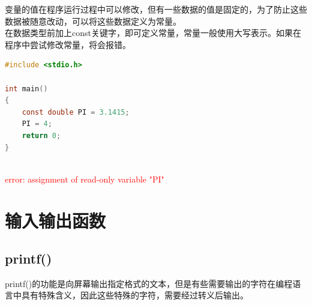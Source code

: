 变量的值在程序运行过程中可以修改，但有一些数据的值是固定的，为了防止这些数据被随意改动，可以将这些数据定义为常量。\\

在数据类型前加上const关键字，即可定义常量，常量一般使用大写表示。如果在程序中尝试修改常量，将会报错。\\


\begin{lstlisting}[language=C]
#include <stdio.h>

int main()
{
	const double PI = 3.1415;
	PI = 4;
	return 0;
}
\end{lstlisting}

\begin{tcolorbox}
	\\
	\textcolor{red}{error: assignment of read-only variable "PI"}
\end{tcolorbox}

\newpage

\section{输入输出函数}

\subsection{printf()}

printf()的功能是向屏幕输出指定格式的文本，但是有些需要输出的字符在编程语言中具有特殊含义，因此这些特殊的字符，需要经过转义后输出。\\

\begin{table}[H]
	\centering
	\caption{转义字符}
\end{table}

